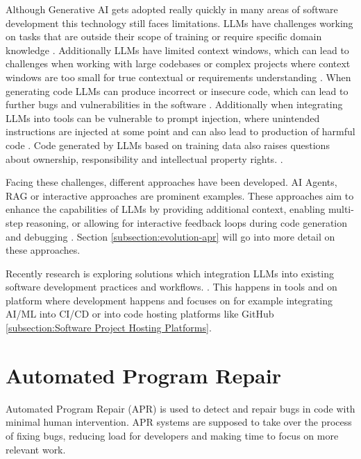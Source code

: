 Although Generative AI gets adopted really quickly in many areas of software development this technology still faces limitations. LLMs have challenges working on tasks that are outside their scope of training or require specific domain knowledge \cite{houLargeLanguageModels2024}. Additionally LLMs have limited context windows, which can lead to challenges when working with large codebases or complex projects where context windows are too small for true contextual or requirements understanding \cite{bhargavmallampatiRoleGenerativeAI2025}. When generating code LLMs can produce incorrect or insecure code, which can lead to further bugs and vulnerabilities in the software \cite{houLargeLanguageModels2024, bhargavmallampatiRoleGenerativeAI2025}. Additionally when integrating LLMs into tools can be vulnerable to prompt injection, where unintended instructions are injected at some point and can also lead to production of harmful code \cite{liuPromptInjectionAttack2024}. Code generated by LLMs based on training data also raises questions about ownership, responsibility and intellectual property rights. \cite{sauvolaFutureSoftwareDevelopment2024, houLargeLanguageModels2024}.

Facing these challenges, different approaches have been developed. AI Agents, RAG or interactive approaches are prominent examples. These approaches aim to enhance the capabilities of LLMs by providing additional context, enabling multi-step reasoning, or allowing for interactive feedback loops during code generation and debugging \cite{houLargeLanguageModels2024, puvvadiCodingAgentsComprehensive2025}. Section \ref{subsection:evolution-apr} will go into more detail on these approaches.

Recently research is exploring solutions which integration LLMs into existing software development practices and workflows. \cite{puvvadiCodingAgentsComprehensive2025, dohmkeGitHubCopilotMeet2025, IntroducingCodex, sauvolaFutureSoftwareDevelopment2024}. This happens in tools and on platform where development happens and focuses on for example integrating AI/ML into CI/CD \cite{mohammedAIDrivenContinuousIntegration2024} or into code hosting platforms like GitHub \ref{subsection:Software Project Hosting Platforms}.

\section{Automated Program Repair}

Automated Program Repair (APR) is used to detect and repair bugs in code with minimal human intervention. \cite{zhangSurveyLearningbasedAutomated2024} APR systems are supposed to take over the process of fixing bugs, reducing load for developers and making time to focus on more relevant work. \cite{houLargeLanguageModels2024}

